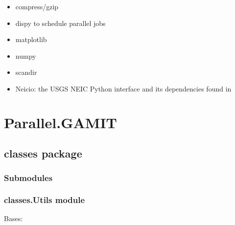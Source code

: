 \documentclass[letterpaper,10pt,english]{sphinxmanual}
\begin{document}
\begin{itemize}
\item {} 
\sphinxAtStartPar
compress/gzip

\item {} 
\sphinxAtStartPar
dispy to schedule parallel jobs

\item {} 
\sphinxAtStartPar
matplotlib

\item {} 
\sphinxAtStartPar
numpy

\item {} 
\sphinxAtStartPar
scandir

\item {} 
\sphinxAtStartPar
Neicio: the USGS NEIC Python interface and its dependencies found in 

\end{itemize}


\chapter{Parallel.GAMIT}
\label{\detokenize{index:parallel-gamit}}
\sphinxstepscope

\sphinxstepscope


\section{classes package}
\label{\detokenize{classes:classes-package}}\label{\detokenize{classes::doc}}\label{\detokenize{classes::doc}}

\subsection{Submodules}
\label{\detokenize{classes:submodules}}

\subsection{classes.Utils module}
\label{\detokenize{classes:module-classes.Utils}}\label{\detokenize{classes:classes-utils-module}}

\begin{fulllineitems}
\label{\detokenize{classes:classes.Utils.UtilsException}}
\pysigstartsignatures
{}
\pysigstopsignatures
\sphinxAtStartPar
Bases: 

\end{fulllineitems}
\end{document}
